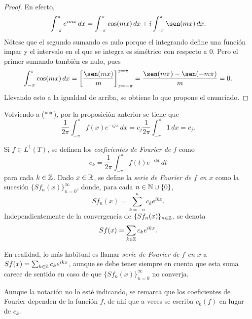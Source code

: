 \documentclass[a4paper, 11pt, oneside]{report}
\begin{document}
\begin{proof}
  En efecto,
  \[\int_{-\pi}^\pi e^{imx} \, dx = \int_{-\pi}^\pi \cos(mx) \, dx + i\int_{-\pi}^\pi \sen(mx)\, dx.\]
  Nótese que el segundo sumando es nulo porque el integrando define una función impar y el intervalo en el que se integra es simétrico con respecto a $0$. Pero el primer sumando también es nulo, pues
  \[\int_{-\pi}^\pi \cos(mx) \, dx = \left[\frac{\sen(mx)}{m}\right]_{x=-\pi}^{x = \pi} = \frac{\sen(m\pi ) - \sen(-m\pi)}{m} = 0.\]
  Llevando esto a la igualdad de arriba, se obtiene lo que propone el enunciado.
\end{proof}

Volviendo a ($\ast\ast$), por la proposición anterior se tiene que
\[\frac{1}{2\pi}\int_{-\pi}^\pi f(x)e^{-ijx} \, dx = c_j\frac{1}{2\pi}\int_{-\pi}^\pi 1 \, dx = c_j.\]

\begin{definition}
  Si $f \in L^1(T)$, se definen los \emph{coeficientes de Fourier de $f$} como 
  \[c_k = \frac{1}{2\pi}\int_{-\pi}^\pi f(t)e^{-ikt}\, dt\]
  para cada $k \in \mathbb Z$. Dado $x \in \mathbb R$, se define la \emph{serie de Fourier de $f$ en $x$} como la sucesión $\{Sf_n(x)\}_{n=0}^\infty$, donde, para cada $n \in \mathbb N \cup \{0\}$,
  \[Sf_n(x) = \sum_{k=-n}^n c_ke^{ikx}.\]
  Independientemente de la convergencia de $\{Sf_n(x)\}_{n \in \mathbb Z}$, se denota
  \[Sf(x) = \sum_{k \in \mathbb Z}c_ke^{ikx}.\]
\end{definition}

En realidad, lo más habitual es llamar \emph{serie de Fourier de $f$ en $x$} a $Sf(x) = \sum_{k \in \mathbb Z}c_ke^{ikx}$, aunque se debe tener siempre en cuenta que esta suma carece de sentido en caso de que $\{Sf_n(x)\}_{n =0}^\infty$ no converja.

Aunque la notación no lo esté indicando, se remarca que los coeficientes de Fourier dependen de la función $f$, de ahí que a veces se escriba $c_k(f)$ en lugar de $c_k$.
\end{document}
